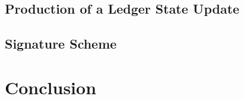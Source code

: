 \documentclass[a4paper, 12pt]{article}
\begin{document}


\subsection{Production of a Ledger State Update}\label{Sec:SecLsu}




\subsection{Signature Scheme}\label{Sec:SSS}




 \newpage
 
\section*{Conclusion} \label{Cha:Con}



 \newpage
 
\begin{raggedright}
\normalem
\printbibliography

\end{raggedright}
\end{document}
